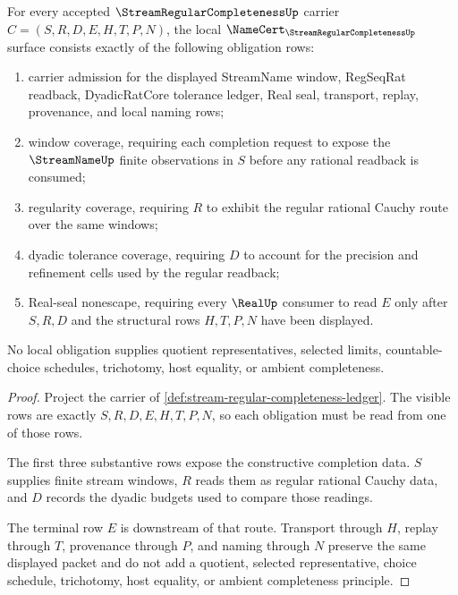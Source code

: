\begin{theorem}
\label{thm:stream-regular-completeness-namecert-obligations}
For every accepted $\StreamRegularCompletenessUp$ carrier $C=(S,R,D,E,H,T,P,N)$, the local $\NameCert_{\StreamRegularCompletenessUp}$ surface consists exactly of the following obligation rows:
\begin{enumerate}
\item carrier admission for the displayed StreamName window, RegSeqRat readback, DyadicRatCore tolerance ledger, Real seal, transport, replay, provenance, and local naming rows;
\item window coverage, requiring each completion request to expose the $\StreamNameUp$ finite observations in $S$ before any rational readback is consumed;
\item regularity coverage, requiring $R$ to exhibit the regular rational Cauchy route over the same windows;
\item dyadic tolerance coverage, requiring $D$ to account for the precision and refinement cells used by the regular readback;
\item Real-seal nonescape, requiring every $\RealUp$ consumer to read $E$ only after $S,R,D$ and the structural rows $H,T,P,N$ have been displayed.
\end{enumerate}
No local obligation supplies quotient representatives, selected limits, countable-choice schedules, trichotomy, host equality, or ambient completeness.
\end{theorem}
\begin{proof}
Project the carrier of \autoref{def:stream-regular-completeness-ledger}. The visible rows are exactly $S,R,D,E,H,T,P,N$, so each obligation must be read from one of those rows.

The first three substantive rows expose the constructive completion data. $S$ supplies finite stream windows, $R$ reads them as regular rational Cauchy data, and $D$ records the dyadic budgets used to compare those readings.

The terminal row $E$ is downstream of that route. Transport through $H$, replay through $T$, provenance through $P$, and naming through $N$ preserve the same displayed packet and do not add a quotient, selected representative, choice schedule, trichotomy, host equality, or ambient completeness principle.
\end{proof}

